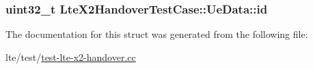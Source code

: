 \subsubsection[{\texorpdfstring{id}{id}}]{\setlength{\rightskip}{0pt plus 5cm}uint32\+\_\+t Lte\+X2\+Handover\+Test\+Case\+::\+Ue\+Data\+::id}\hypertarget{structLteX2HandoverTestCase_1_1UeData_a4495b7275f4dc19135a1fbb862d10384}{}\label{structLteX2HandoverTestCase_1_1UeData_a4495b7275f4dc19135a1fbb862d10384}


The documentation for this struct was generated from the following file\+:\begin{DoxyCompactItemize}
\item 
lte/test/\hyperlink{test-lte-x2-handover_8cc}{test-\/lte-\/x2-\/handover.\+cc}\end{DoxyCompactItemize}
